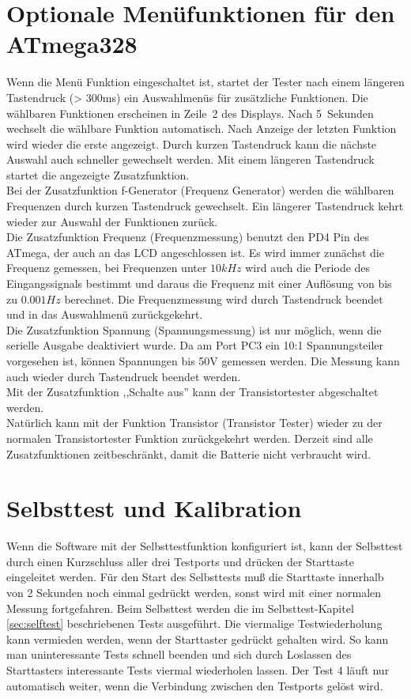 \section{Optionale Menüfunktionen für den ATmega328}
Wenn die Menü Funktion eingeschaltet ist, startet der Tester nach einem längeren Tastendruck (> 300ms) ein Auswahlmenüs
für zusätzliche Funktionen.
Die wählbaren Funktionen erscheinen in Zeile~2 des Displays. Nach 5~Sekunden wechselt die wählbare Funktion automatisch.
Nach Anzeige der letzten Funktion wird wieder die erste angezeigt.
Durch kurzen Tastendruck kann die nächste Auswahl auch schneller gewechselt werden. Mit einem längeren Tastendruck startet
die angezeigte Zusatzfunktion.\\

Bei der Zusatzfunktion f-Generator (Frequenz Generator) werden die wählbaren Frequenzen durch kurzen Tastendruck gewechselt.
Ein längerer Tastendruck kehrt wieder zur Auswahl der Funktionen zurück.\\

Die Zusatzfunktion Frequenz (Frequenzmessung) benutzt den PD4 Pin des ATmega, der auch an das LCD angeschlossen ist.
Es wird immer zunächst die Frequenz gemessen, bei Frequenzen unter \(10 kHz\) wird auch die Periode des Eingangssignals bestimmt
und daraus die Frequenz mit einer Auflösung von bis zu \(0.001 Hz\) berechnet.
Die Frequenzmessung wird durch Tastendruck beendet und in das Auswahlmenü zurückgekehrt.\\

Die Zusatzfunktion Spannung (Spannungsmessung) ist nur möglich, wenn die serielle Ausgabe deaktiviert wurde.
Da am Port PC3 ein 10:1 Spannungsteiler vorgesehen ist, können Spannungen bis 50V gemessen werden.
Die Messung kann auch wieder durch Tastendruck beendet werden.\\

Mit der Zusatzfunktion ,,Schalte aus'' kann der Transistortester abgeschaltet werden.\\

Natürlich kann mit der Funktion Transistor (Transistor Tester) wieder zu der normalen Transistortester Funktion
zurückgekehrt werden. Derzeit sind alle Zusatzfunktionen zeitbeschränkt, damit die Batterie nicht verbraucht wird.

\section{Selbsttest und Kalibration}

Wenn die Software mit der Selbsttestfunktion konfiguriert ist, kann der Selbsttest durch einen Kurzschluss aller drei
Testports und drücken der Starttaste eingeleitet werden.
Für den Start des Selbsttests muß die Starttaste innerhalb von 2 Sekunden noch einmal gedrückt werden,
sonst wird mit einer normalen Messung fortgefahren.
Beim Selbsttest werden die im Selbsttest-Kapitel \ref{sec:selftest} beschriebenen Tests ausgeführt.
Die viermalige Testwiederholung kann vermieden werden, wenn der Starttaster gedrückt gehalten wird.
So kann man uninteressante Tests schnell beenden und
sich durch Loslassen des Starttasters interessante Tests viermal wiederholen lassen.
Der Test 4 läuft nur automatisch weiter, wenn die Verbindung zwischen den Testports gelöst wird.


